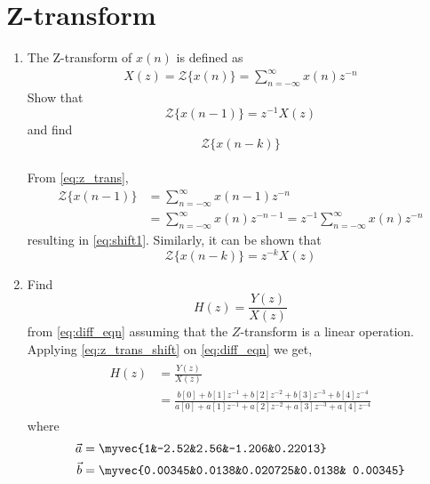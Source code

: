 \documentclass[journal,12pt,twocolumn]{IEEEtran}
\renewcommand\thesection{\arabic{section}}
\begin{document}
\section{Z-transform}
\begin{enumerate}[label=\thesection.\arabic*,ref=\thesection.\theenumi]
\item
\label{prob:Z-transform_formula}
%
The Z-transform of $x(n)$ is defined as
\begin{align}
\label{eq:z_trans}
X(z)={\mathcal {Z}}\{x(n)\}=\sum _{n=-\infty }^{\infty }x(n)z^{-n}
\end{align}
%
Show that
\begin{equation}
\label{eq:shift1}
{\mathcal {Z}}\{x(n-1)\} = z^{-1}X(z)
\end{equation}
and find
\begin{equation}
	{\mathcal {Z}}\{x(n-k)\} 
\end{equation}
\\
\solution From \eqref{eq:z_trans},
\begin{align}
{\mathcal {Z}}\{x(n-1)\} &=\sum _{n=-\infty }^{\infty }x(n-1)z^{-n}
\\
&=\sum _{n=-\infty }^{\infty }x(n)z^{-n-1} = z^{-1}\sum _{n=-\infty }^{\infty }x(n)z^{-n}
\end{align}
resulting in \eqref{eq:shift1}. Similarly, it can be shown that
%
\begin{equation}
\label{eq:z_trans_shift}
	{\mathcal {Z}}\{x(n-k)\} = z^{-k}X(z)
\end{equation}
\item Find
%
\begin{equation}
H(z) = \frac{Y(z)}{X(z)}
\end{equation}
%
from  \eqref{eq:diff_eqn} assuming that the $Z$-transform is a linear operation.
\\
\solution  Applying \eqref{eq:z_trans_shift} on \eqref{eq:diff_eqn} we get,
\begin{align}
\begin{split}
H(z) &= \frac{Y(z)}{X(z)}                
\\
&=\frac{b[0]+b[1]z^{-1}+b[2]z^{-2}+b[3]z^{-3}+b[4]z^{-4}}{a[0]+a[1]z^{-1}+a[2]z^{-2}+a[3]z^{-3}+a[4]z^{-4}}
\label{eq:freq_resp}
\end{split}
\end{align}
where
\begin{align}
\vec{a} &= \myvec{1&-2.52&2.56&-1.206&0.22013}\\
\vec{b} &=\myvec{0.00345&0.0138&0.020725&0.0138& 0.00345}
\end{align}

\end{enumerate}
\end{document}
